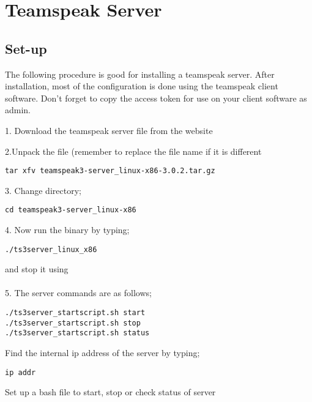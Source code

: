 \chapter{Teamspeak Server}
\section{Set-up}

The following procedure is good for installing a teamspeak server. After installation, most of the configuration is done using the teamspeak client software.  Don't forget to copy the access token for use on your client software as admin.

1. Download the teamspeak server file from the website \vspace{0.25cm}

2.Unpack the file (remember to replace the file name if it is different
\begin{lstlisting}
tar xfv teamspeak3-server_linux-x86-3.0.2.tar.gz
\end{lstlisting}

3. Change directory;
\begin{lstlisting}
cd teamspeak3-server_linux-x86
\end{lstlisting}

4. Now run the binary by typing;
\begin{lstlisting}
./ts3server_linux_x86
\end{lstlisting}
and stop it using \\
\\
5. The server commands are as follows;
\begin{lstlisting}
./ts3server_startscript.sh start
./ts3server_startscript.sh stop
./ts3server_startscript.sh status
\end{lstlisting}

Find the internal ip address of the server by typing;\begin{lstlisting}
ip addr
\end{lstlisting}\vspace{0.5cm}

Set up a bash file to start, stop or check status of server
